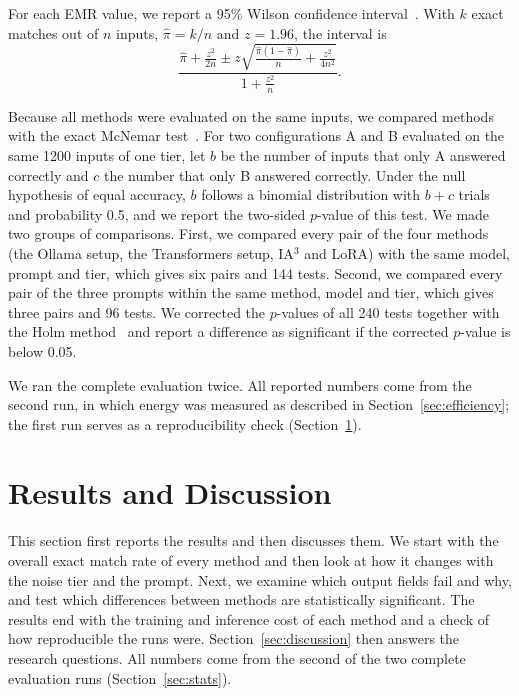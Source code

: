 \documentclass[journal,article,submit,pdftex,moreauthors]{Definitions/mdpi}
\begin{document}
For each EMR value, we report a 95\% Wilson confidence interval~\citep{wilson1927probable}. With $k$ exact matches out of $n$ inputs, $\hat{\pi} = k/n$ and $z = 1.96$, the interval is
\begin{equation}
\frac{\hat{\pi} + \frac{z^2}{2n} \pm z \sqrt{\frac{\hat{\pi}(1-\hat{\pi})}{n} + \frac{z^2}{4n^2}}}{1 + \frac{z^2}{n}}.
\label{eq:wilson}
\end{equation}

Because all methods were evaluated on the same inputs, we compared methods with the exact McNemar test~\citep{mcnemar1947note}. For two configurations A and B evaluated on the same 1200 inputs of one tier, let $b$ be the number of inputs that only A answered correctly and $c$ the number that only B answered correctly. Under the null hypothesis of equal accuracy, $b$ follows a binomial distribution with $b + c$ trials and probability 0.5, and we report the two-sided $p$-value of this test. We made two groups of comparisons. First, we compared every pair of the four methods (the Ollama setup, the Transformers setup, IA$^3$ and LoRA) with the same model, prompt and tier, which gives six pairs and 144 tests. Second, we compared every pair of the three prompts within the same method, model and tier, which gives three pairs and 96 tests. We corrected the $p$-values of all 240 tests together with the Holm method~\citep{holm1979simple} and report a difference as significant if the corrected $p$-value is below 0.05.

We ran the complete evaluation twice. All reported numbers come from the second run, in which energy was measured as described in Section~\ref{sec:efficiency}; the first run serves as a reproducibility check (Section~\ref{sec:results}).

\section{Results and Discussion}\label{sec:results}

This section first reports the results and then discusses them. We start with the overall exact match rate of every method and then look at how it changes with the noise tier and the prompt. Next, we examine which output fields fail and why, and test which differences between methods are statistically significant. The results end with the training and inference cost of each method and a check of how reproducible the runs were. Section~\ref{sec:discussion} then answers the research questions. All numbers come from the second of the two complete evaluation runs (Section~\ref{sec:stats}).
\end{document}
